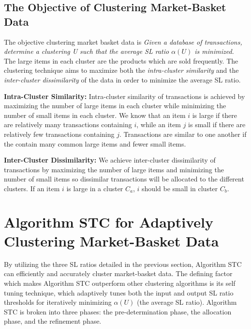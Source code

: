 \documentclass[11pt,reqno]{amsart}
\theoremstyle{definition}
\numberwithin{equation}{subsection}
\begin{document}
\subsection{The Objective of Clustering Market-Basket Data}

The objective clustering market basket data is {\em Given a database of transactions, determine a clustering U such that the average SL ratio $\alpha(U)$ is minimized.} The large items in each cluster are the products which are sold frequently. The clustering technique aims to maximize both the {\em intra-cluster similarity} and the {\em inter-cluster dissimilarity} of the data in order to minimize the average SL ratio. 

\textbf{Intra-Cluster Similarity:} Intra-cluster similarity of transactions is achieved by maximizing the number of large items in each cluster while minimizing the number of small items in each cluster. We know that an item $i$ is large if there are relatively many transactions containing $i$, while an item $j$ is small if there are relatively few transactions containing $j$. Transactions are similar to one another if the contain many common large items and fewer small items. 

\textbf{Inter-Cluster Dissimilarity:} We achieve inter-cluster dissimilarity of transactions by maximizing the number of large items and minimizing the number of small items so dissimilar transactions will be allocated to the different clusters. If an item $i$ is large in a cluster $C_a$, $i$ should be small in cluster $C_b$. 

\section{Algorithm STC for Adaptively Clustering Market-Basket Data}
 By utilizing the three SL ratios detailed in the previous section, Algorithm STC can efficiently and accurately cluster market-basket data. The defining factor which  makes Algorithm STC outperform other clustering algorithms is its self tuning technique, which adaptively tunes both the input and output SL ratio thresholds for iteratively minimizing $\alpha(U)$ (the average SL ratio). Algorithm STC is broken into three phases: the pre-determination phase, the allocation phase, and the refinement phase.
\end{document}
